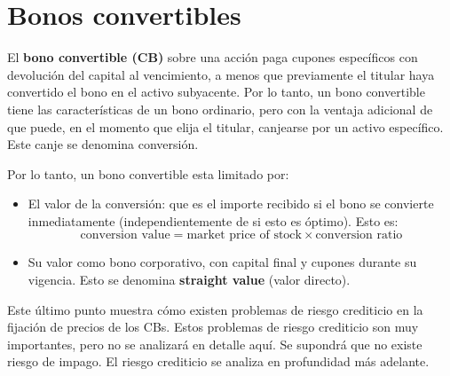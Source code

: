 \section{Bonos convertibles}
El \textbf{bono convertible (CB)} sobre una acción paga cupones específicos con devolución del capital al vencimiento, a menos que previamente el titular haya convertido el bono en el activo subyacente.
Por lo tanto, un bono convertible tiene las características de un bono ordinario, pero con la ventaja adicional de que puede, en el momento que elija el titular, canjearse por un activo específico. Este canje se denomina conversión. 

Por lo tanto, un bono convertible esta limitado por:
\begin{itemize}
    \item El valor de la conversión: que es el importe recibido si el bono se convierte inmediatamente (independientemente de si esto es óptimo). Esto es:
    \begin{equation*}
        \text{conversion value} = \text{market price of stock} \times \text{conversion ratio}
    \end{equation*}
    \item Su valor como bono corporativo, con capital final y cupones durante su vigencia. Esto se denomina \textbf{straight value} (valor directo).
\end{itemize}

Este último punto muestra cómo existen problemas de riesgo crediticio en la fijación de precios de los CBs. Estos problemas de riesgo crediticio son muy importantes, pero no se analizará en detalle aquí. Se supondrá que no existe riesgo de impago. El riesgo crediticio se analiza en profundidad más adelante.









